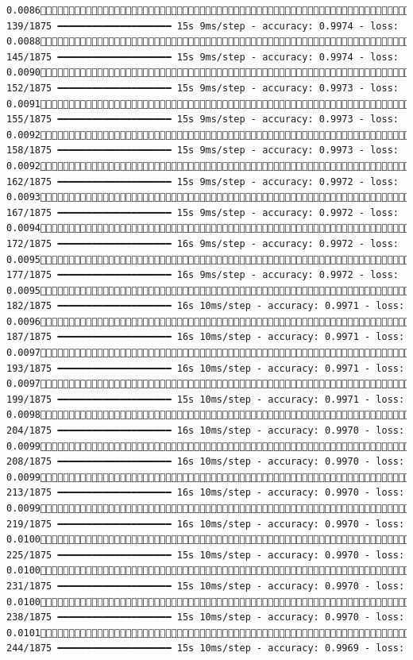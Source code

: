 \documentclass[
  letterpaper,
  DIV=11,
  numbers=noendperiod]{scrreprt}
\begin{document}
\begin{verbatim}
0.0086 139/1875 ━━━━━━━━━━━━━━━━━━━━ 15s 9ms/step - accuracy: 0.9974 - loss: 0.0088 145/1875 ━━━━━━━━━━━━━━━━━━━━ 15s 9ms/step - accuracy: 0.9974 - loss: 0.0090 152/1875 ━━━━━━━━━━━━━━━━━━━━ 15s 9ms/step - accuracy: 0.9973 - loss: 0.0091 155/1875 ━━━━━━━━━━━━━━━━━━━━ 15s 9ms/step - accuracy: 0.9973 - loss: 0.0092 158/1875 ━━━━━━━━━━━━━━━━━━━━ 15s 9ms/step - accuracy: 0.9973 - loss: 0.0092 162/1875 ━━━━━━━━━━━━━━━━━━━━ 15s 9ms/step - accuracy: 0.9972 - loss: 0.0093 167/1875 ━━━━━━━━━━━━━━━━━━━━ 15s 9ms/step - accuracy: 0.9972 - loss: 0.0094 172/1875 ━━━━━━━━━━━━━━━━━━━━ 16s 9ms/step - accuracy: 0.9972 - loss: 0.0095 177/1875 ━━━━━━━━━━━━━━━━━━━━ 16s 9ms/step - accuracy: 0.9972 - loss: 0.0095 182/1875 ━━━━━━━━━━━━━━━━━━━━ 16s 10ms/step - accuracy: 0.9971 - loss: 0.0096 187/1875 ━━━━━━━━━━━━━━━━━━━━ 16s 10ms/step - accuracy: 0.9971 - loss: 0.0097 193/1875 ━━━━━━━━━━━━━━━━━━━━ 16s 10ms/step - accuracy: 0.9971 - loss: 0.0097 199/1875 ━━━━━━━━━━━━━━━━━━━━ 15s 10ms/step - accuracy: 0.9971 - loss: 0.0098 204/1875 ━━━━━━━━━━━━━━━━━━━━ 16s 10ms/step - accuracy: 0.9970 - loss: 0.0099 208/1875 ━━━━━━━━━━━━━━━━━━━━ 16s 10ms/step - accuracy: 0.9970 - loss: 0.0099 213/1875 ━━━━━━━━━━━━━━━━━━━━ 16s 10ms/step - accuracy: 0.9970 - loss: 0.0099 219/1875 ━━━━━━━━━━━━━━━━━━━━ 16s 10ms/step - accuracy: 0.9970 - loss: 0.0100 225/1875 ━━━━━━━━━━━━━━━━━━━━ 15s 10ms/step - accuracy: 0.9970 - loss: 0.0100 231/1875 ━━━━━━━━━━━━━━━━━━━━ 15s 10ms/step - accuracy: 0.9970 - loss: 0.0100 238/1875 ━━━━━━━━━━━━━━━━━━━━ 15s 10ms/step - accuracy: 0.9970 - loss: 0.0101 244/1875 ━━━━━━━━━━━━━━━━━━━━ 15s 10ms/step - accuracy: 0.9969 - loss: 
\end{verbatim}
\end{document}

